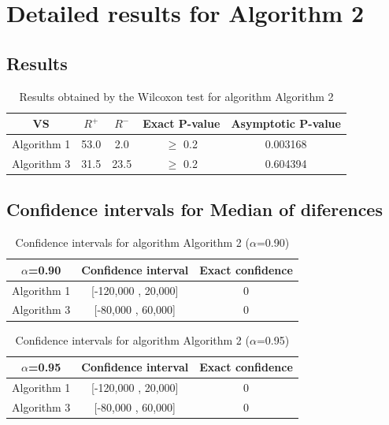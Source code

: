 \documentclass[a4paper,10pt]{article}
\begin{document}
 \clearpage 


\section{Detailed results for Algorithm 2}


\subsection{Results}

\begin{table}[!htp]
\centering\small
\begin{tabular}{
|c|c|c|c|c|}
\hline
 VS & $R^{+}$ & $R^{-}$ & Exact P-value & Asymptotic P-value \\ \hline 
Algorithm 1 & 53.0 & 2.0 & $\geq$ 0.2 & 0.003168\\ \hline 
Algorithm 3 & 31.5 & 23.5 & $\geq$ 0.2 & 0.604394\\ \hline 

\end{tabular}
\caption{Results obtained by the Wilcoxon test for algorithm Algorithm 2}
\end{table}

\subsection{Confidence intervals for Median of diferences}

\begin{table}[!htp]
\centering\small
\begin{tabular}{
|c|c|c|}
\hline
 $\alpha$=0.90 & Confidence interval & Exact confidence \\ \hline 
Algorithm 1 & [-120,000 , 20,000] & 0\\ \hline 
Algorithm 3 & [-80,000 , 60,000] & 0\\ \hline 

\end{tabular}
\caption{Confidence intervals for algorithm Algorithm 2 ($\alpha$=0.90)}
\end{table}
\begin{table}[!htp]
\centering\small
\begin{tabular}{
|c|c|c|}
\hline
 $\alpha$=0.95 & Confidence interval & Exact confidence \\ \hline 
Algorithm 1 & [-120,000 , 20,000] & 0\\ \hline 
Algorithm 3 & [-80,000 , 60,000] & 0\\ \hline 

\end{tabular}
\caption{Confidence intervals for algorithm Algorithm 2 ($\alpha$=0.95)}
\end{table}
\end{document}
